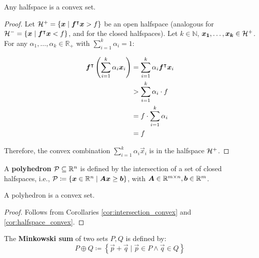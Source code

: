 \begin{corollary}\label{cor:halfspace_convex}
Any halfspace is a convex set.
\end{corollary}

\begin{proof}
Let $\mathcal{H}^+ = \{{\bm{x}} \mid {\bm{f}}^\intercal {\bm{x}} > f\}$ be an open halfspace (analogous for $\mathcal{H}^- = \{{\bm{x}} \mid {\bm{f}}^\intercal {\bm{x}} < f\}$, and for the closed halfspaces). Let $k \in \mathbb{N}$, ${\bm{x_1}}, \dots, {\bm{x_k}} \in \mathcal{H}^+$. For any $\alpha_1, \dots, \alpha_k \in \mathbb{R}_+$ with $\sum_{i=1}^{k} \alpha_i = 1$:

\begin{align*}
{\bm{f}}^\intercal \left( \sum_{i=1}^{k} \alpha_i {\bm{x}}_i \right)
&= \sum_{i=1}^{k} \alpha_i {\bm{f}}^\intercal {\bm{x}}_i \\
&> \sum_{i=1}^{k} \alpha_i \cdot f \\
&= f \cdot \sum_{i=1}^{k} \alpha_i \\
&= f
\end{align*}

Therefore, the convex combination $\sum_{i=1}^{k} \alpha_i \vec{x}_i$ is in the halfspace $\mathcal{H}^+$.
\end{proof}

\begin{definition}
A \textbf{polyhedron} $\mathcal{P} \subseteq \mathbb{R}^n$ is defined by the intersection of a set of closed halfspaces, i.e., $\mathcal{P} \coloneqq \{{\bm{x}} \in \mathbb{R}^n \mid {\bm{A}} {\bm{x}} \geq {\bm{b}}\}$, with ${\bm{A}} \in \mathbb{R}^{m \times n}, {\bm{b}} \in \mathbb{R}^m$.
\end{definition}

\begin{corollary}
A polyhedron is a convex set.
\end{corollary}

\begin{proof}
Follows from Corollaries \ref{cor:intersection_convex} and \ref{cor:halfspace_convex}.
\end{proof}

\begin{definition}
The \textbf{Minkowski sum} of two sets $P, Q$ is defined by:
\begin{equation*}
P \oplus Q \coloneqq \left\{\vec{p} + \vec{q} \mid \vec{p} \in P \land \vec{q} \in Q \right\}
\end{equation*}
\end{definition}


